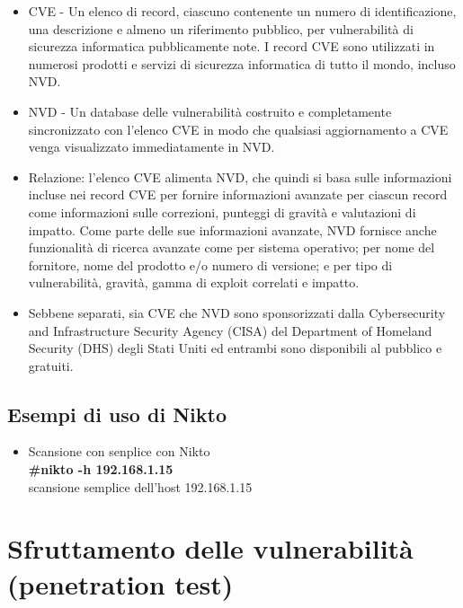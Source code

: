 \documentclass[a4paper,12pt]{article}
\begin{document}
\begin{itemize}
\item CVE - Un elenco di record, ciascuno contenente un numero di identificazione, una descrizione e almeno un riferimento pubblico, per vulnerabilità di sicurezza informatica pubblicamente note. I record CVE sono utilizzati in numerosi prodotti e servizi di sicurezza informatica di tutto il mondo, incluso NVD.
\item NVD - Un database delle vulnerabilità costruito e completamente sincronizzato con l'elenco CVE in modo che qualsiasi aggiornamento a CVE venga visualizzato immediatamente in NVD.
\item Relazione: l'elenco CVE alimenta NVD, che quindi si basa sulle informazioni incluse nei record CVE per fornire informazioni avanzate per ciascun record come informazioni sulle correzioni, punteggi di gravità e valutazioni di impatto. Come parte delle sue informazioni avanzate, NVD fornisce anche funzionalità di ricerca avanzate come per sistema operativo; per nome del fornitore, nome del prodotto e/o numero di versione; e per tipo di vulnerabilità, gravità, gamma di exploit correlati e impatto.

\item Sebbene separati, sia CVE che NVD sono sponsorizzati dalla Cybersecurity and Infrastructure Security Agency (CISA) del Department of Homeland Security (DHS) degli Stati Uniti ed entrambi sono disponibili al pubblico e gratuiti.
\end{itemize}

\subsection{Esempi di uso di Nikto}

\begin{itemize}

\item Scansione con senplice con Nikto \\
        \textbf{ \#nikto -h 192.168.1.15} \\
        scansione semplice dell'host 192.168.1.15
\end{itemize}

\section{  Sfruttamento delle vulnerabilità (penetration test) }
\end{document}
